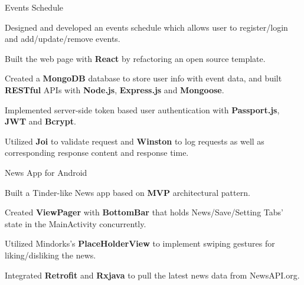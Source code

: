 \begin{cvsimpleprojects}

  \cvsimpleproject
    {Events Schedule}
    {
      \begin{cvitems}
        \item {Designed and developed an events schedule which allows user to register/login and  add/update/remove events.}
        \item {Built the web page with \textbf{React} by refactoring an open source template.}
        \item {Created a \textbf{MongoDB} database to store user info with event data, and built \textbf{RESTful} APIs with \textbf{Node.js}, \textbf{Express.js} and \textbf{Mongoose}.}
        \item {Implemented server-side token based user authentication with \textbf{Passport.js}, \textbf{JWT} and \textbf{Bcrypt}.}
        \item {Utilized \textbf{Joi} to validate request and \textbf{Winston} to log requests as well as corresponding response content and response time.}
      \end{cvitems}
    }
    
    
    \cvsimpleproject
    {News App for Android}
    {
      \begin{cvitems}
        \item {Built a Tinder-like News app based on \textbf{MVP} architectural pattern.}
        \item {Created \textbf{ViewPager} with \textbf{BottomBar} that holds News/Save/Setting Tabs’ state in the MainActivity concurrently.}
        \item {Utilized Mindorks’s \textbf{PlaceHolderView} to implement swiping gestures for liking/disliking the news.}
        \item{Integrated \textbf{Retrofit} and \textbf{Rxjava} to pull the latest news data from NewsAPI.org.}
      \end{cvitems}
    }
    

\end{cvsimpleprojects}

